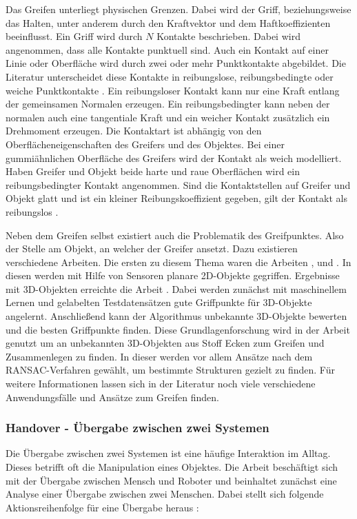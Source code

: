 Das Greifen unterliegt physischen Grenzen. Dabei wird der Griff, beziehungsweise das Halten, unter anderem durch den Kraftvektor und dem Haftkoeffizienten beeinflusst. Ein Griff wird durch $N$ Kontakte beschrieben. Dabei wird angenommen, dass alle Kontakte punktuell sind. Auch ein Kontakt auf einer Linie oder Oberfläche wird durch zwei oder mehr Punktkontakte abgebildet. Die Literatur unterscheidet diese Kontakte in reibungslose, reibungsbedingte oder weiche Punktkontakte \citep{salisbury1983kinematic}. Ein reibungsloser Kontakt kann nur eine Kraft entlang der gemeinsamen Normalen erzeugen. Ein reibungsbedingter kann neben der normalen auch eine tangentiale Kraft und ein weicher Kontakt zusätzlich ein Drehmoment erzeugen. Die Kontaktart ist abhängig von den Oberflächeneigenschaften des Greifers und des Objektes. Bei einer gummiähnlichen Oberfläche des Greifers wird der Kontakt als weich modelliert. Haben Greifer und Objekt beide harte und raue Oberflächen wird ein reibungsbedingter Kontakt angenommen. Sind die Kontaktstellen auf Greifer und Objekt glatt und ist ein kleiner Reibungskoeffizient gegeben, gilt der Kontakt als reibungslos \citep{bicchi2000robotic}.


Neben dem Greifen selbst existiert auch die Problematik des Greifpunktes. Also der Stelle am Objekt, an welcher der Greifer ansetzt. Dazu existieren verschiedene Arbeiten. Die ersten zu diesem Thema waren die Arbeiten \cite{kamon1996learning}, \cite{coelho2001developing} und \cite{bowers2003manipulation}. In diesen werden mit Hilfe von Sensoren planare 2D-Objekte gegriffen. Ergebnisse mit 3D-Objekten erreichte die Arbeit \cite{saxena2008robotic}. Dabei werden zunächst mit maschinellem Lernen und gelabelten Testdatensätzen gute Griffpunkte für 3D-Objekte angelernt. Anschließend kann der Algorithmus unbekannte 3D-Objekte bewerten und die besten Griffpunkte finden. Diese Grundlagenforschung wird in der Arbeit \cite{maitin2010cloth} genutzt um an unbekannten 3D-Objekten aus Stoff Ecken zum Greifen und Zusammenlegen zu finden. In dieser werden vor allem Ansätze nach dem RANSAC-Verfahren gewählt, um bestimmte Strukturen gezielt zu finden. Für weitere Informationen lassen sich in der Literatur noch viele verschiedene Anwendungsfälle und Ansätze zum Greifen finden.

\subsubsection{Handover - Übergabe zwischen zwei Systemen}
Die Übergabe zwischen zwei Systemen ist eine häufige Interaktion im Alltag. Dieses betrifft oft die Manipulation eines Objektes. Die Arbeit \cite{huber2008human} beschäftigt sich mit der Übergabe zwischen Mensch und Roboter und beinhaltet zunächst eine Analyse einer Übergabe zwischen zwei Menschen. Dabei stellt sich folgende Aktionsreihenfolge für eine Übergabe heraus \citep{huber2008human}:

